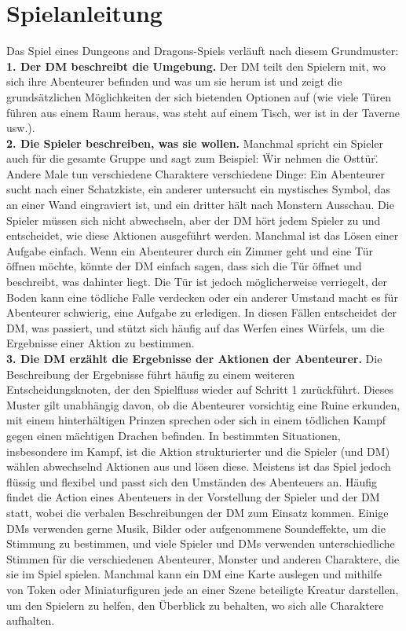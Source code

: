 \section{Spielanleitung}
Das Spiel eines Dungeons and Dragons-Spiels verläuft nach diesem Grundmuster:\\
\textbf{1. Der DM beschreibt die Umgebung.} Der DM teilt den Spielern mit, wo sich ihre Abenteurer befinden und was um sie herum ist und zeigt die grundsätzlichen Möglichkeiten der sich bietenden Optionen auf (wie viele Türen führen aus einem Raum heraus, was steht auf einem Tisch, wer ist in der Taverne usw.).\\
\textbf{2. Die Spieler beschreiben, was sie wollen.}
Manchmal spricht ein Spieler auch für die gesamte Gruppe und sagt zum Beispiel: \"Wir nehmen die Osttür\". Andere Male tun verschiedene Charaktere verschiedene Dinge: Ein Abenteurer sucht nach einer Schatzkiste, ein anderer untersucht ein mystisches Symbol, das an einer Wand eingraviert ist, und ein dritter hält nach Monstern Ausschau. Die Spieler müssen sich nicht abwechseln, aber der DM hört jedem Spieler zu und entscheidet, wie diese Aktionen ausgeführt werden. Manchmal ist das Lösen einer Aufgabe einfach. Wenn ein Abenteurer durch ein Zimmer geht und eine Tür öffnen möchte, könnte der DM einfach sagen, dass sich die Tür öffnet und beschreibt, was dahinter liegt. Die Tür ist jedoch möglicherweise verriegelt, der Boden kann eine tödliche Falle verdecken oder ein anderer Umstand macht es für Abenteurer schwierig, eine Aufgabe zu erledigen. In diesen Fällen entscheidet der DM, was passiert, und stützt sich häufig auf das Werfen eines Würfels, um die Ergebnisse einer Aktion zu bestimmen.\\
\textbf{3. Die DM erzählt die Ergebnisse der Aktionen der Abenteurer.}
Die Beschreibung der Ergebnisse führt häufig zu einem weiteren Entscheidungsknoten, der den Spielfluss wieder auf Schritt 1 zurückführt. Dieses Muster gilt unabhängig davon, ob die Abenteurer vorsichtig eine Ruine erkunden, mit einem hinterhältigen Prinzen sprechen oder sich in einem tödlichen Kampf gegen einen mächtigen Drachen befinden. In bestimmten Situationen, insbesondere im Kampf, ist die Aktion strukturierter und die Spieler (und DM) wählen abwechselnd Aktionen aus und lösen diese. Meistens ist das Spiel jedoch flüssig und flexibel und passt sich den Umständen des Abenteuers an. Häufig findet die Action eines Abenteuers in der Vorstellung der Spieler und der DM statt, wobei die verbalen Beschreibungen der DM zum Einsatz kommen. Einige DMs verwenden gerne Musik, Bilder oder aufgenommene Soundeffekte, um die Stimmung zu bestimmen, und viele Spieler und DMs verwenden unterschiedliche Stimmen für die verschiedenen Abenteurer, Monster und anderen Charaktere, die sie im Spiel spielen. Manchmal kann ein DM eine Karte auslegen und mithilfe von Token oder Miniaturfiguren jede an einer Szene beteiligte Kreatur darstellen, um den Spielern zu helfen, den Überblick zu behalten, wo sich alle Charaktere aufhalten.
\newpage
